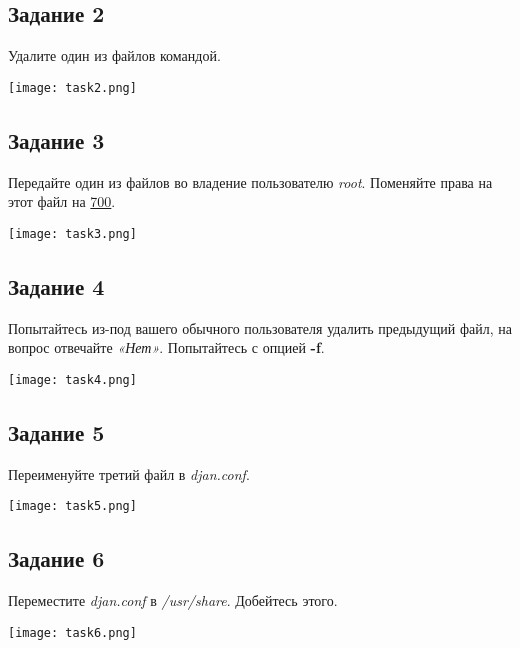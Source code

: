\documentclass[12pt, a4paper]{report}
\begin{document}
			\subsection*{Задание 2}
			Удалите один из файлов командой.
			\lstset{style=mystyle}
			
			\begin{center}
				\texttt{[image: task2.png]}
			\end{center}

			\subsection*{Задание 3}
 			Передайте один из файлов во владение пользователю \textit{root}. Поменяйте права на этот файл на \underline{700}.
			\lstset{style=mystyle}
			
			\begin{center}
				\texttt{[image: task3.png]}
			\end{center}
			
			\subsection*{Задание 4}
			Попытайтесь из-под вашего обычного пользователя удалить предыдущий файл, на вопрос отвечайте \textit{«Нет»}. Попытайтесь с опцией \textbf{-f}.
			\lstset{style=mystyle}
			
			\begin{center}
				\texttt{[image: task4.png]}
			\end{center}
	
			\subsection*{Задание 5}
			Переименуйте третий файл в \textit{djan.conf}.
			\lstset{style=mystyle}
			
			\begin{center}
				\texttt{[image: task5.png]}
			\end{center}
	
			\subsection*{Задание 6}
			Переместите \textit{djan.conf} в \textit{/usr/share}. Добейтесь этого.
			\lstset{style=mystyle}
			
			\begin{center}
				\texttt{[image: task6.png]}
			\end{center}
	
\end{document}
